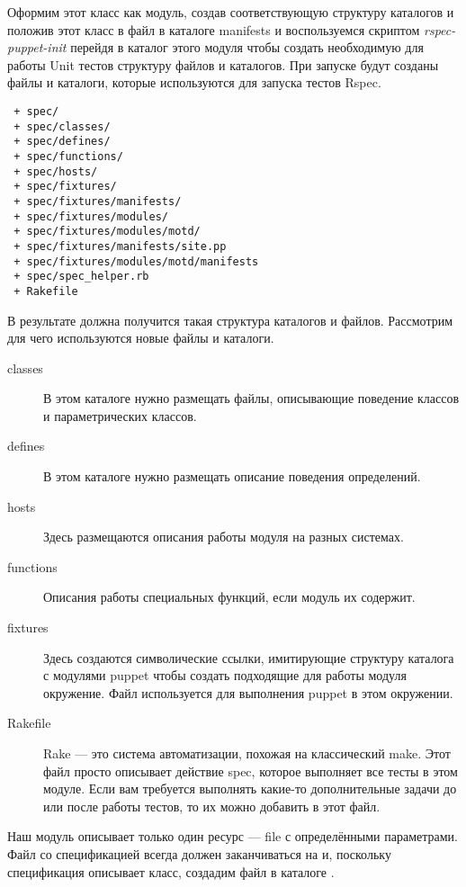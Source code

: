 Оформим этот класс как модуль, создав соответствующую структуру каталогов и положив этот класс в файл  в каталоге manifests и воспользуемся скриптом \emph{rspec-puppet-init} перейдя в каталог этого модуля чтобы создать необходимую для работы Unit тестов структуру файлов и каталогов. При запуске будут созданы файлы и каталоги, которые используются для запуска тестов Rspec.

\begin{verbatim}
 + spec/
 + spec/classes/
 + spec/defines/
 + spec/functions/
 + spec/hosts/
 + spec/fixtures/
 + spec/fixtures/manifests/
 + spec/fixtures/modules/
 + spec/fixtures/modules/motd/
 + spec/fixtures/manifests/site.pp
 + spec/fixtures/modules/motd/manifests
 + spec/spec_helper.rb
 + Rakefile
\end{verbatim}

В результате должна получится такая структура каталогов и файлов. Рассмотрим для чего используются новые файлы и каталоги.


\begin{description}
\item[classes] В этом каталоге нужно размещать файлы, описывающие поведение классов и параметрических классов.
\item[defines] В этом каталоге нужно размещать описание поведения определений.
\item[hosts] Здесь размещаются описания работы модуля на разных системах.
\item[functions] Описания работы специальных функций, если модуль их содержит.
\item[fixtures] Здесь создаются символические ссылки, имитирующие структуру каталога с модулями puppet чтобы создать подходящие для работы модуля окружение. Файл  используется для выполнения puppet в этом окружении.
\item[Rakefile] Rake --- это система автоматизации, похожая на классический make. Этот файл просто описывает действие spec, которое выполняет все тесты в этом модуле. Если вам требуется выполнять какие-то дополнительные задачи до или после работы тестов, то их можно добавить в этот файл.
\end{description}

Наш модуль описывает только один ресурс --- file с определёнными параметрами. Файл со спецификацией всегда должен заканчиваться на  и, поскольку спецификация описывает класс, создадим файл в каталоге .

